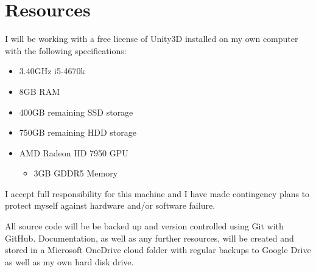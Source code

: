 
\section{Resources}

I will be working with a free license of Unity3D installed on my own computer with the following specifications:
\begin{itemize}
\item 3.40GHz i5-4670k
\item 8GB RAM
\item 400GB remaining SSD storage
\item 750GB remaining HDD storage
\item AMD Radeon HD 7950 GPU
	\begin{itemize}
	\item 3GB GDDR5 Memory
	\end{itemize}
\end{itemize}

I accept full responsibility for this machine and I have made contingency plans to protect myself against hardware and/or software failure.

All source code will be be backed up and version controlled using Git with GitHub. Documentation, as well as any further resources, will be created and stored in a Microsoft OneDrive cloud folder with regular backups to Google Drive as well as my own hard disk drive.
